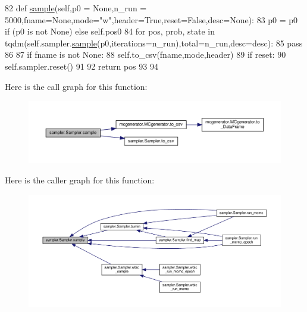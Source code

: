 \begin{DoxyCode}
82     \textcolor{keyword}{def }\hyperlink{classsampler_1_1Sampler_a9403aa08f08af30f703b7b507431d7a9}{sample}(self,p0 = None,n\_run = 5000,fname=None,mode="w",header=True,reset=False,desc=None):
83         p0 = p0 \textcolor{keywordflow}{if} (p0 \textcolor{keywordflow}{is} \textcolor{keywordflow}{not} \textcolor{keywordtype}{None}) \textcolor{keywordflow}{else} self.pos0
84         \textcolor{keywordflow}{for} pos, prob, state \textcolor{keywordflow}{in} tqdm(self.sampler.\hyperlink{classsampler_1_1Sampler_a9403aa08f08af30f703b7b507431d7a9}{sample}(p0,iterations=n\_run),total=n\_run,desc=desc):
85             \textcolor{keywordflow}{pass}
86         
87         \textcolor{keywordflow}{if} fname \textcolor{keywordflow}{is} \textcolor{keywordflow}{not} \textcolor{keywordtype}{None}:
88             self.to\_csv(fname,mode,header)
89         \textcolor{keywordflow}{if} reset:
90             self.sampler.reset()
91         
92         \textcolor{keywordflow}{return} pos
93     
94     
\end{DoxyCode}
Here is the call graph for this function\+:\nopagebreak
\begin{figure}[H]
\begin{center}
\leavevmode
\includegraphics[width=350pt]{d3/d8a/classsampler_1_1Sampler_a9403aa08f08af30f703b7b507431d7a9_cgraph}
\end{center}
\end{figure}
Here is the caller graph for this function\+:\nopagebreak
\begin{figure}[H]
\begin{center}
\leavevmode
\includegraphics[width=350pt]{d3/d8a/classsampler_1_1Sampler_a9403aa08f08af30f703b7b507431d7a9_icgraph}
\end{center}
\end{figure}
\mbox{\label{classsampler_1_1Sampler_a57168d6c5801b89109e2a2cd7d7ff4ce}} 
